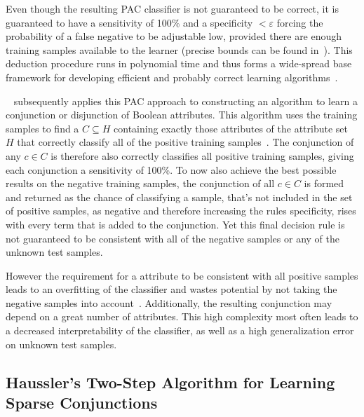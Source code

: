 Even though the resulting PAC classifier is not guaranteed to be correct, it is guaranteed to have a sensitivity of 100\% and a specificity \(< \varepsilon \)
forcing the probability of a false negative to be adjustable low, provided there are enough training samples available to the learner (precise bounds can be found in~\cite{valiant}).
This deduction procedure runs in polynomial time and thus forms a wide-spread base framework for developing efficient and probably correct learning algorithms~\citep{haussler90}.

~\cite{valiant} subsequently applies this PAC approach to constructing an algorithm to learn a conjunction or disjunction of Boolean attributes.
This algorithm uses the training samples to find a \(C \subseteq H\) containing exactly those attributes of the attribute set \(H\)
that correctly classify all of the positive training samples~\citep{marchand02}.
The conjunction of any \(c \in C\) is therefore also correctly classifies all positive training samples, giving each conjunction a sensitivity of 100\%.
To now also achieve the best possible results on the negative training samples, the conjunction of all \(c \in C\)  is formed and returned
as the chance of classifying a sample, that's not included in the set of positive samples, as negative
and therefore increasing the rules specificity, rises with every term that is added to the conjunction.
Yet this final decision rule is not guaranteed to be consistent with all of the negative samples or any of the unknown test samples.

However the requirement for a attribute to be consistent with all positive samples leads to an overfitting of the classifier
and wastes potential by not taking the negative samples into account~\citep{haussler88,marchand02}.
Additionally, the resulting conjunction may depend on a great number of attributes.
This high complexity most often leads to a decreased interpretability of the classifier,
as well as a high generalization error on unknown test samples.

\subsection{Haussler's Two-Step Algorithm for Learning Sparse Conjunctions}

